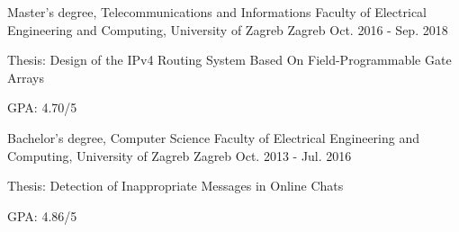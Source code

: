 
\begin{cventries}

  \cventry
    {Master's degree, Telecommunications and Informations} %
    {Faculty of Electrical Engineering and Computing, University of Zagreb} %
    {Zagreb} %
    {Oct. 2016 - Sep. 2018} %
    {
      \begin{cvitems} %
        \item {Thesis: Design of the IPv4 Routing System Based On Field-Programmable Gate Arrays}
        \item {GPA: 4.70/5}
      \end{cvitems}
    }

  \cventry
    {Bachelor's degree, Computer Science} %
    {Faculty of Electrical Engineering and Computing, University of Zagreb} %
    {Zagreb} %
    {Oct. 2013 - Jul. 2016} %
    {
      \begin{cvitems} %
        \item {Thesis: Detection of Inappropriate Messages in Online Chats}
        \item {GPA: 4.86/5}
      \end{cvitems}
    }

\end{cventries}
